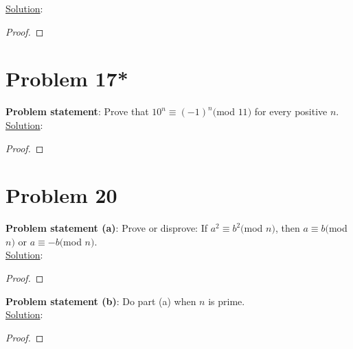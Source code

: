 \documentclass{article} %
\begin{document}
\underline{Solution}: 
\begin{addmargin}[1em]{0em}
\begin{proof}

\end{proof}
\end{addmargin}

\newpage

\section*{Problem 17*}


\textbf{Problem statement}: Prove that $10^n \equiv (-1)^n($mod $ 11)$ for every positive $n$.
\\

\underline{Solution}: 
\begin{addmargin}[1em]{0em}
\begin{proof}

\end{proof}
\end{addmargin}

\newpage

\section*{Problem 20}


\textbf{Problem statement (a)}: Prove or disprove: If $a^2 \equiv b^2 ($mod $n)$, then $a \equiv b($mod $ n)$ or $a \equiv -b($mod $n)$. 
\\

\underline{Solution}: 
\begin{addmargin}[1em]{0em}
\begin{proof}

\end{proof}
\end{addmargin}

\hfill \break

\textbf{Problem statement (b)}: Do part (a) when $n$ is prime. 
\\

\underline{Solution}: 
\begin{addmargin}[1em]{0em}
\begin{proof}

\end{proof}
\end{addmargin}
\end{document}
